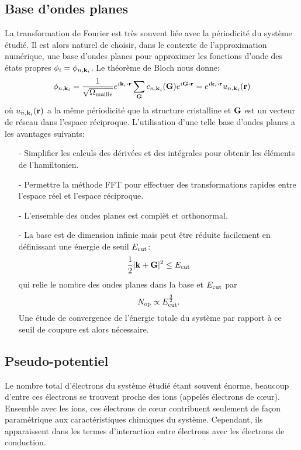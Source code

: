 \subsection{Base d'ondes planes}
\label{subsec-planewave}
La transformation de Fourier est très souvent liée avec la périodicité du système étudié.
Il est alors naturel de choisir, dans le contexte de l'approximation numérique,
une base d'ondes planes pour approximer les fonctions d'onde des états propres $\phi_i = \phi_{n,\vb{k}_i}$.
Le théorème de Bloch nous donne:
\begin{equation*}
  \phi_{n,\vb{k}_i}
  = \frac{1}{\sqrt{\Omega_{\V{maille}}}}e^{i\vb{k}_i\vdot\vb{r}}\sum_{\vb{G}} c_{n,\vb{k}_i}(\vb{G})e^{i\vb{G}\vdot\vb{r}}
  = e^{i\vb{k}_i\vdot\vb{r}} u_{n,\vb{k}_i}(\vb{r})
\end{equation*}
où $u_{n,\vb{k}_i}(\vb{r})$ a la même périodicité que la structure cristalline
et $\vb{G}$ est un vecteur de réseau dans l'espace réciproque.
L'utilisation d'une telle base d'ondes planes a les avantages suivants:
\begin{itemize}
  \item[-] Simplifier les calculs des dérivées et des intégrales pour obtenir les éléments de l'hamiltonien.
  \item[-] Permettre la méthode FFT pour effectuer des transformations rapides entre l'espace réel et l'espace réciproque.
  \item[-] L'ensemble des ondes planes est complèt et orthonormal.
  \item[-] La base est de dimension infinie mais peut être réduite facilement
    en définissant une énergie de seuil $E_{\textnormal{cut}}$:
    \begin{equation}
      \frac{1}{2}|\vb{k}+\vb{G}|^2 \leq E_{\textnormal{cut}}
    \end{equation}
    qui relie le nombre des ondes planes dans la base et $E_{\textnormal{cut}}$ par
    \begin{equation}
      N_{\textnormal{op}}\propto E_{\textnormal{cut}}^{\frac{3}{2}}.
    \end{equation}
    Une étude de convergence de l'énergie totale du système par rapport à ce seuil de coupure est alors nécessaire.
\end{itemize}

\subsection{Pseudo-potentiel}
\label{subsec-pseudo}
Le nombre total d'électrons du système étudié étant souvent énorme,
beaucoup d'entre ces électrons se trouvent proche des ions (appelés électrons de cœur).
Ensemble avec les ions, ces électrons de cœur contribuent seulement de façon paramétrique
aux caractéristiques chimiques du système.
Cependant, ils apparaissent dans les termes d'interaction entre électrons avec les électrons de conduction.


